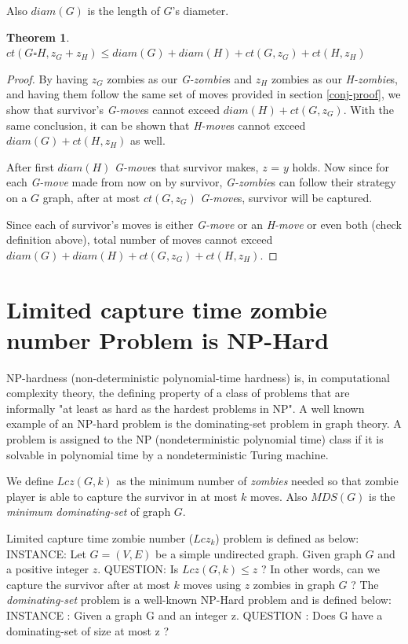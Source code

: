 \documentclass[1p]{elsarticle}
\newtheorem{theorem}{Theorem}
\begin{document}
	Also $diam(G)$ is the length of $G$'s diameter.
	\begin{theorem}
		\label{T5}
		$ct( G \square H, z_G + z_H ) \leq diam(G) + diam(H) + ct(G, z_G) + ct(H, z_H)$
	\end{theorem}
	\begin{proof}
		By having $z_G$ zombies as our {\it G-zombie}s and $z_H$ zombies as our {\it H-zombie}s, and having them follow
		the same set of moves provided in section \ref{conj-proof}, we show that survivor's {\it G-move}s cannot exceed
		$diam(H) + ct(G, z_G)$. With the same conclusion, it can be shown that {\it H-move}s cannot exceed $diam(G) +
		ct(H, z_H)$ as well.

		After first $diam(H)$ {\it G-move}s that survivor makes, $z$ = $y$ holds. Now since for each {\it G-move} made
		from now on by survivor, {\it G-zombie}s can follow their strategy on a $G$ graph, after at most $ct(G,z_G)$
		{\it G-move}s, survivor will be captured. 
		
		Since each of survivor's moves is either {\it G-move} or an {\it H-move} or even both (check definition above),
		total number of moves cannot exceed $diam(G) + diam(H) + ct(G, z_G) + ct(H, z_H)$.
	\end{proof}
\section{Limited capture time zombie number Problem is NP-Hard}\label{np-capturetime}

	NP-hardness (non-deterministic polynomial-time hardness) is, in computational complexity theory, the defining
	property of a class of problems that are informally "at least as hard as the hardest problems in NP". A well known
	example of an NP-hard problem is the dominating-set problem in graph theory. A problem is assigned to the NP
	(nondeterministic polynomial time) class if it is solvable in polynomial time by a nondeterministic Turing machine.


	We define $Lcz(G,k)$ as the minimum number of {\it zombies} needed so that zombie player is able to capture the survivor in at
	most $k$ moves. Also $MDS(G)$ is the {\it minimum dominating-set} of graph $G$.
	
	Limited capture time zombie number ($Lcz_k$) problem is defined as below:
	{\newline}
	INSTANCE: Let $G = (V,E)$ be a simple undirected graph. Given graph $G$ and a positive integer $z$.
	{\newline}
	QUESTION: Is $Lcz(G,k) \leq z$ ? In other words, can we capture the survivor after at most $k$ moves using $z$ zombies in graph $G$ ?
	{\newline}
	{\newline}
	The {\it dominating-set} problem is a well-known NP-Hard problem and is defined below:
	{\newline}
	INSTANCE : Given a graph G and an integer z.
	{\newline}
	QUESTION : Does G have a dominating-set of size at most z ?
\end{document}
